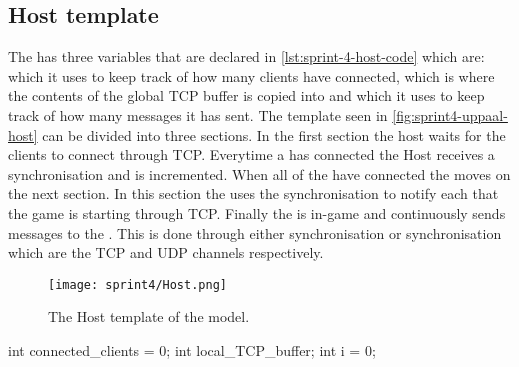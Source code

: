 \subsection{Host template}
The  has three variables that are declared in \autoref{lst:sprint-4-host-code} which are:
 which it uses to keep track of how many clients have connected,  which is where the contents of the global TCP buffer is copied into and  which it uses to keep track of how many messages it has sent. 
The template seen in \autoref{fig:sprint4-uppaal-host} can be divided into three sections.
In the first section the host waits for the clients to connect through TCP.
Everytime a  has connected the Host receives a  synchronisation and  is incremented.
When all of the  have connected the  moves on the next section.
In this section the  uses the  synchronisation to notify each  that the game is starting through TCP.
Finally the  is in-game and continuously sends messages to the .
This is done through either  synchronisation or  synchronisation which are the TCP and UDP channels respectively.
\begin{figure}[h]
    \centering
    \texttt{[image: sprint4/Host.png]}
    \caption{The Host template of the \uppaal model.}
    \label{fig:sprint4-uppaal-host}
\end{figure}
\begin{uppaalcode}[caption={local Host declarations}, label={lst:sprint-4-host-code},captionpos=b]

int connected_clients = 0;
int local_TCP_buffer;
int i = 0;
\end{uppaalcode}


